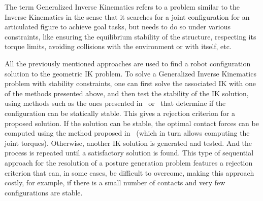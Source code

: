 The term Generalized Inverse Kinematics refers to a problem similar to the Inverse Kinematics in the sense that it searches for a joint configuration for an articulated figure to achieve goal tasks, but needs to do so under various constraints, like ensuring the equilibrium stability of the structure, respecting its torque limits, avoiding collisions with the environment or with itself, etc.

All the previously mentioned approaches are used to find a robot configuration solution to the geometric IK problem.
To solve a Generalized Inverse Kinematics problem with stability constraints, one can first solve the associated IK with one of the methods presented above, and then test the stability of the IK solution, using methods such as the ones presented in~\cite{bretl:itro:2008} or~\cite{rimon2008general} that determine if the configuration can be statically stable.
This gives a rejection criterion for a proposed solution.
If the solution can be stable, the optimal contact forces can be computed using the method proposed in~\cite{boyd2007fast} (which in turn allows computing the joint torques).
Otherwise, another IK solution is generated and tested.
And the process is repeated until a satisfactory solution is found.
This type of sequential approach for the resolution of a posture generation problem features a rejection criterion that can, in some cases, be difficult to overcome, making this approach costly, for example, if there is a small number of contacts and very few configurations are stable.


